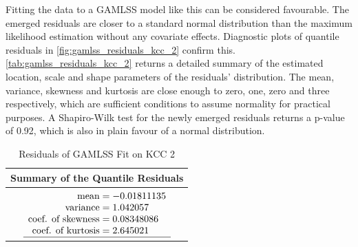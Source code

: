 Fitting the data to a \ac{GAMLSS} model like this can be considered favourable. The emerged residuals are closer to a standard normal distribution than the maximum likelihood estimation without any covariate effects. Diagnostic plots of quantile residuals in \autoref{fig:gamlss_residuals_kcc_2} confirm this. \autoref{tab:gamlss_residuals_kcc_2} returns a detailed summary of the estimated location, scale and shape parameters of the residuals' distribution. The mean, variance, skewness and kurtosis are close enough to zero, one, zero and three respectively, which are sufficient conditions to assume normality for practical purposes. A Shapiro-Wilk test for the newly emerged residuals returns a p-value of 0.92, which is also in plain favour of a normal distribution.
\\




\begin{table}[H]
\centering
\begin{tabular}{c}
\hline
\rowcolor{white} 
\textbf{Summary of the Quantile Residuals} \\ \hline\hline
 $\begin{array}[t]{ r @{{}={}} l }
\text{mean} & -0.01811135                         \\ 
\text{variance} & 1.042057                        \\ 
\text{coef. of skewness} & 0.08348086             \\ 
\text{coef. of kurtosis} & 2.645021               \\ \hline
\end{array}$
\end{tabular}
\caption{Residuals of GAMLSS Fit on KCC 2}
\label{tab:gamlss_residuals_kcc_2}
\end{table}




